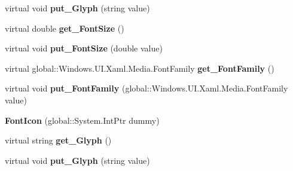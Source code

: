 \begin{DoxyCompactItemize}
\mbox{\label{class_windows_1_1_u_i_1_1_xaml_1_1_controls_1_1_font_icon_adce42635121ffcf86756f04dc4002c0c}} 
virtual void {\bfseries put\+\_\+\+Glyph} (string value)
\item 
\mbox{\label{class_windows_1_1_u_i_1_1_xaml_1_1_controls_1_1_font_icon_a56c9091282a44095056b589c9e417ec8}} 
virtual double {\bfseries get\+\_\+\+Font\+Size} ()
\item 
\mbox{\label{class_windows_1_1_u_i_1_1_xaml_1_1_controls_1_1_font_icon_ab6e9c5d300ab27fe473978c6792a49a5}} 
virtual void {\bfseries put\+\_\+\+Font\+Size} (double value)
\item 
\mbox{\label{class_windows_1_1_u_i_1_1_xaml_1_1_controls_1_1_font_icon_a1ec67522af9017e450d6266855bc81d5}} 
virtual global\+::\+Windows.\+U\+I.\+Xaml.\+Media.\+Font\+Family {\bfseries get\+\_\+\+Font\+Family} ()
\item 
\mbox{\label{class_windows_1_1_u_i_1_1_xaml_1_1_controls_1_1_font_icon_a1f39590903627ddd712e1b20dba0c7ff}} 
virtual void {\bfseries put\+\_\+\+Font\+Family} (global\+::\+Windows.\+U\+I.\+Xaml.\+Media.\+Font\+Family value)
\item 
\mbox{\label{class_windows_1_1_u_i_1_1_xaml_1_1_controls_1_1_font_icon_a8416249e681423ded4616ce07522b6aa}} 
{\bfseries Font\+Icon} (global\+::\+System.\+Int\+Ptr dummy)
\item 
\mbox{\label{class_windows_1_1_u_i_1_1_xaml_1_1_controls_1_1_font_icon_a5eed21875f8e0fd909a420f8ddf1d1a9}} 
virtual string {\bfseries get\+\_\+\+Glyph} ()
\item 
\mbox{\label{class_windows_1_1_u_i_1_1_xaml_1_1_controls_1_1_font_icon_adce42635121ffcf86756f04dc4002c0c}} 
virtual void {\bfseries put\+\_\+\+Glyph} (string value)
\item 

\end{DoxyCompactItemize}
